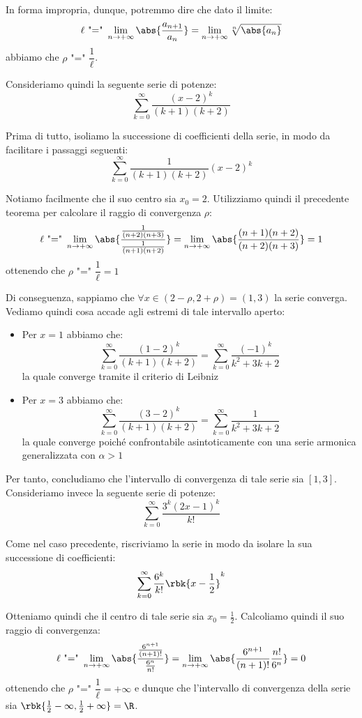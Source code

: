\documentclass[a4paper, 12pt]{report}
\begin{document}
    In forma impropria, dunque, potremmo dire che dato il limite:
    \[\ell \text{ "=" }\lim_{n \to +\infty} \abs{\frac{a_{n+1}}{a_n}} = \lim_{n \to +\infty} \sqrt[n]{\abs{a_n}}\]
    abbiamo che $\rho \text{ "=" } \dfrac{1}{\ell}$.

    Consideriamo quindi la seguente serie di potenze:
    \[\sum_{k=0}^{\infty} \frac{(x-2)^k}{(k+1)(k+2)}\]

    Prima di tutto, isoliamo la successione di coefficienti della serie, in modo da facilitare i passaggi seguenti:
    \[\sum_{k=0}^{\infty} \frac{1}{(k+1)(k+2)} (x-2)^k\]

    Notiamo facilmente che il suo centro sia $x_0 = 2$. Utilizziamo quindi il precedente teorema per calcolare il raggio di convergenza $\rho$:
    \[\ell \text{ "=" } \lim_{n \to +\infty} \abs{\frac{\frac{1}{(n+2)(n+3)}}{\frac{1}{(n+1)(n+2)}}} = \lim_{n \to +\infty} \abs{\frac{(n+1)(n+2)}{(n+2)(n+3)}} = 1\]
    ottenendo che $\rho \text{ "=" } \dfrac{1}{\ell} = 1$

    Di conseguenza, sappiamo che $\forall x \in (2 - \rho, 2 + \rho) = (1,3)$ la serie converga. Vediamo quindi cosa accade agli estremi di tale intervallo aperto:
    \begin{itemize}
        \item Per $x = 1$ abbiamo che:
        \[\sum_{k=0}^{\infty} \frac{(1-2)^k }{(k+1)(k+2)}= \sum_{k=0}^{\infty} \frac{(-1)^k}{k^2 + 3k + 2}\]
        la quale converge tramite il criterio di Leibniz

        \item Per $x = 3$ abbiamo che:
        \[\sum_{k=0}^{\infty} \frac{(3-2)^k }{(k+1)(k+2)}= \sum_{k=0}^{\infty} \frac{1}{k^2 + 3k + 2}\]
        la quale converge poiché confrontabile asintoticamente con una serie armonica generalizzata con $\alpha > 1$
    \end{itemize}

    Per tanto, concludiamo che l'intervallo di convergenza di tale serie sia $[1, 3]$. Consideriamo invece la seguente serie di potenze:
    \[ \sum_{k=0}^{\infty} \frac{3^k(2x-1)^k}{k!} \]

    Come nel caso precedente, riscriviamo la serie in modo da isolare la sua successione di coefficienti:
    \[ \sum_{k=0}^{\infty} \frac{6^k}{k!}\rbk{x-\frac{1}{2}}^k\]

    Otteniamo quindi che il centro di tale serie sia $x_0 = \frac{1}{2}$. Calcoliamo quindi il suo raggio di convergenza:
    \[\ell \text{ "=" } \lim_{n \to +\infty} \abs{\frac{\frac{6^{n+1}}{(n+1)!}}{\frac{6^n}{n!}}} = \lim_{n \to +\infty} \abs{\frac{6^{n+1}}{(n+1)!}\frac{n!}{6^n}} = 0\]
    ottenendo che $\rho \text{ "=" } \dfrac{1}{\ell} = +\infty$ e dunque che l'intervallo di convergenza della serie sia $\rbk{\frac{1}{2} - \infty, \frac{1}{2} + \infty} = \R$.
\end{document}

